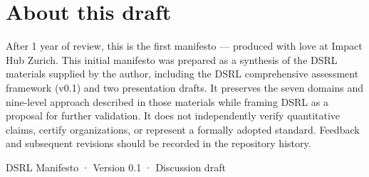 \documentclass[11pt,a4paper]{article}
\begin{document}
\section*{About this draft}
After 1 year of review, this is the first manifesto --- produced with love at Impact Hub Zurich.
This initial manifesto was prepared as a synthesis of the DSRL materials supplied by the author, including the DSRL comprehensive assessment framework (v0.1) and two presentation drafts. It preserves the seven domains and nine-level approach described in those materials while framing DSRL as a proposal for further validation. It does not independently verify quantitative claims, certify organizations, or represent a formally adopted standard. Feedback and subsequent revisions should be recorded in the repository history.

\vfill
\begin{center}\small\color{gray}DSRL Manifesto · Version 0.1 · Discussion draft\end{center}
\end{document}
